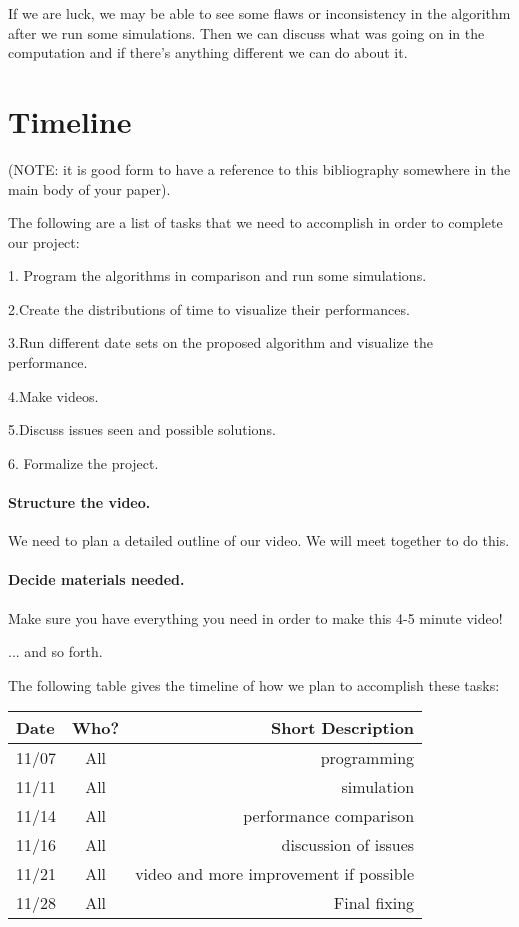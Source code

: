 \documentclass[11pt,twocolumn]{article}
\begin{document}
If we are luck, we may be able to see some flaws or inconsistency in the algorithm after we run some simulations. Then we can discuss what was going on in the computation and if there's anything different we can do about it.



 

\newpage
\onecolumn
\appendix
\section{Timeline}
(NOTE: it is good form to have a reference to this bibliography somewhere in 
the main body of your paper).

The following are a list of tasks that we need to accomplish in order to 
complete our project:

1. Program the algorithms in comparison and run some simulations.

2.Create the distributions of time to visualize their performances.

3.Run different date sets on the proposed algorithm and visualize the performance.

4.Make videos.

5.Discuss issues seen and possible solutions.

6. Formalize the project.

\paragraph{Structure the video.} We need to plan a detailed outline of our 
video.  We will meet together to do this.

\paragraph{Decide materials needed.}  Make sure you have everything you need in 
order to make this 4-5 minute video!

... and so forth.

The following table gives the timeline of how we plan to accomplish these tasks:

\begin{table}[h!]
\centering
\begin{tabular}{ |l | c | r|}
  \hline
  Date & Who? & Short Description \\
  \hline
  \hline
  11/07 & All & programming \\
  \hline
  11/11 & All & simulation \\
  
  \hline
  11/14 & All & performance comparison \\
  
  \hline
  11/16 & All & discussion of issues \\
  
  \hline
  11/21 & All & video and more improvement if possible \\
  
 
  \hline
  11/28 & All & Final fixing \\
  \hline
\end{tabular}
\end{table}
\end{document}
